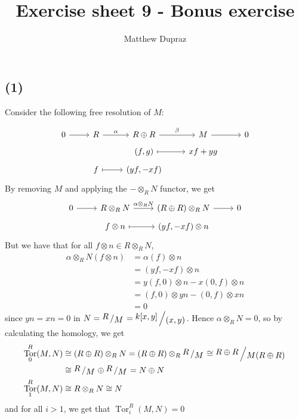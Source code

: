 \documentclass{article}
\title{Exercise sheet 9 - Bonus exercise}
\author{Matthew Dupraz}
\DeclareMathOperator{\Tor}{Tor}
\newcommand{\tensor}{\otimes}
\newcommand{\quotient}[2]{{\raisebox{.2em}{$#1$}\left/\raisebox{-.2em}{$#2$}\right.}}
\newcommand{\isom}{\cong}
\begin{document}
	
\maketitle

\subsection*{(1)}

Consider the following free resolution of $M$:

\[\begin{tikzcd}[row sep=tiny]
	0 & R & R \oplus R & M & 0 \\
	&& {(f,g)} & {xf + yg} \\
	& f & {(yf, -xf)}
	\arrow[from=1-1, to=1-2]
	\arrow["\alpha", from=1-2, to=1-3]
	\arrow["\beta", from=1-3, to=1-4]
	\arrow[from=1-4, to=1-5]
	\arrow[maps to, from=3-2, to=3-3]
	\arrow[maps to, from=2-3, to=2-4]
\end{tikzcd}\]
By removing $M$ and applying the $-\tensor_R N$ functor, we get
\[\begin{tikzcd}[row sep=tiny]
	0 & {R\tensor_R N} & {(R \oplus R)\tensor_R N} & 0 \\
	& {f\tensor n} & {(yf,-xf)\tensor n}
	\arrow[from=1-1, to=1-2]
	\arrow["{\alpha \tensor_R N}", from=1-2, to=1-3]
	\arrow[from=1-3, to=1-4]
	\arrow[maps to, from=2-2, to=2-3]
\end{tikzcd}\]
But we have that for all $f\tensor n \in R \tensor_R N$, 
\begin{align*}
	\alpha\tensor_R N(f\tensor n) &= \alpha(f)\tensor n\\
	&= (yf, -xf)\tensor n\\
	&= y(f, 0)\tensor n -x(0, f)\tensor n\\
	&= (f, 0)\tensor yn - (0, f) \tensor xn\\
	&= 0
\end{align*}
since $yn = xn = 0$ in $N = \quotient{R}{M} = \quotient{k[x, y]}{(x, y)}$.
Hence $\alpha \tensor_R N = 0$, so by calculating the homology, we get
\begin{align*}
	\Tor_0^R(M, N) &\isom (R \oplus R)\tensor_R N
	= (R\oplus R)\tensor_R \quotient{R}{M}
	\isom \quotient{R\oplus R}{M(R\oplus R)}\\
	&\isom \quotient{R}{M} \oplus \quotient{R}{M} = N\oplus N\\
	\Tor_1^R(M, N) &\isom R \tensor_R N \isom N
\end{align*}
and for all $i > 1$, we get that $\Tor_i^R(M, N) = 0$
\end{document}
